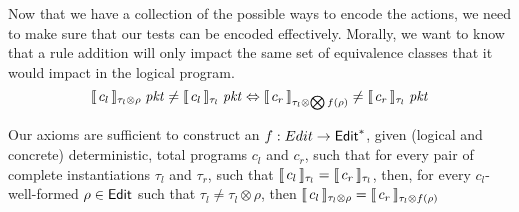 Now that we have a collection of the possible ways to encode the
actions, we need to make sure that our tests can be encoded
effectively. Morally, we want to know that a rule addition will only
impact the same set of equivalence classes that it would impact in the
logical program.
%
%
\[ \llbracket\,c_l \,\rrbracket_{\tau_l \otimes \rho}\; \mathit{pkt} \neq \llbracket\,c_l\,\rrbracket_{\tau_l} \; \mathit{pkt} \Leftrightarrow
  \llbracket\,c_r\,\rrbracket_{\tau_l \otimes \bigotimes f(\rho)} \neq \llbracket\,c_r\,\rrbracket_{\tau_l}\; \mathit{pkt} \]


\begin{proposition}
  Our axioms are sufficient to construct an $f : Edit \to \mathsf{Edit}^*$,
  given (logical and concrete) deterministic, total programs $c_l$ and
  $c_r$, such that for every pair of complete instantiations $\tau_l$
  and $\tau_r$, such that
  $\llbracket\,c_l\,\rrbracket_{\tau_l} = \llbracket\,c_r\,\rrbracket_{\tau_l}$, then, for every
  $c_l$-well-formed $\rho \in \mathsf{Edit}$ such that
  $\tau_l \neq \tau_l \otimes \rho$, then
  $\llbracket\,c_l\,\rrbracket_{\tau_l \otimes \rho} = \llbracket\,c_r\,\rrbracket_{\tau_l \otimes
    f(\rho)}$
\end{proposition}


